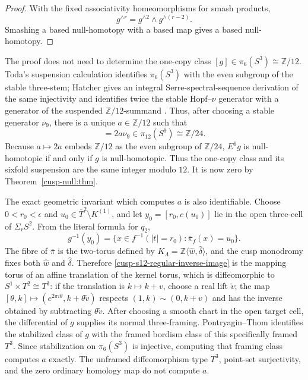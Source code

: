 \begin{proof}
With the fixed associativity homeomorphisms for smash products,
\[
 g^{\wedge r}=g^{\wedge2}\wedge g^{\wedge(r-2)}.
\]
Smashing a based null-homotopy with a based map gives a based
null-homotopy.
\end{proof}

\begin{remark}
\label{cusp-s12-one-copy-invariant}
The proof does not need to determine the one-copy class
\([g]\in\pi_6(S^3)\cong\mathbb Z/12\).  Toda's suspension calculation
identifies \(\pi_6(S^3)\) with the even subgroup of the stable three-stem;
Hatcher gives an integral Serre-spectral-sequence derivation of the same
injectivity and identifies twice the stable Hopf--\(\nu\) generator with a
generator of the suspended \(\mathbb Z/12\)-summand
\cite[Theorem~5.41(b), p.~573, and pp.~577--578]{HatcherSpectralSequences}.
Thus, after choosing a stable generator \(\nu_9\), there is a unique
\(a\in\mathbb Z/12\) such that
\begin{equation}
 [E^6g]=2a\nu_9\in\pi_{12}(S^9)\cong\mathbb Z/24.
 \label{cusp-s12-sixfold-suspension-class}
\end{equation}
Because \(a\mapsto2a\) embeds \(\mathbb Z/12\) as the even subgroup of
\(\mathbb Z/24\), \(E^6g\) is null-homotopic if and only if \(g\) is
null-homotopic.  Thus the one-copy class and its sixfold suspension are the
same integer modulo \(12\). It is now zero by Theorem~\ref{cusp-null:thm}.

The exact geometric invariant which computes \(a\) is also identifiable.
Choose \(0<r_0<\epsilon\) and
\(u_0\in\overline T^2\setminus K^{(1)}\), and let
\(y_0=[r_0,c(u_0)]\) lie in the open three-cell of
\(\Sigma_rS^2\).  From the literal formula for \(q_2\),
\begin{equation}
 g^{-1}(y_0)
 =\{x\in f^{-1}(|t|=r_0):\overline\pi_f(x)=u_0\}.
 \label{cusp-s12-regular-inverse-image}
\end{equation}
The fibre of \(\overline\pi\) is the two-torus defined by
\(K_\Lambda=\mathbb Z\langle\widehat w,\widehat\delta\rangle\), and the
cusp monodromy fixes both \(\widehat w\) and \(\widehat\delta\).  Therefore
\eqref{cusp-s12-regular-inverse-image} is the mapping torus of an affine translation of the kernel torus,
which is diffeomorphic to \(S^1\times T^2\cong T^3\): if the translation is
\(k\mapsto k+v\), choose a real lift \(\widetilde v\); the map
\([\theta,k]\mapsto(e^{2\pi i\theta},k+\theta\widetilde v)\) respects
\((1,k)\sim(0,k+v)\) and has the inverse obtained by subtracting
\(\theta\widetilde v\). After choosing a smooth chart in the open
target cell, the differential of \(g\) supplies its normal three-framing.
Pontryagin--Thom identifies the stabilized class of \(g\) with the framed
bordism class of this specifically framed \(T^3\).  Since stabilization on
\(\pi_6(S^3)\) is injective, computing that framing class computes \(a\)
exactly.  The unframed diffeomorphism type \(T^3\), point-set surjectivity,
and the zero ordinary homology map do not compute \(a\).
\end{remark}


